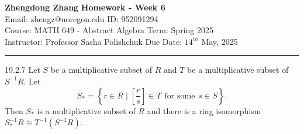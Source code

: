 \documentclass[a4paper, 12pt]{article}
\begin{document}
\noindent
\large\textbf{Zhengdong Zhang} \hfill \textbf{Homework - Week 6} \\
Email: zhengz@uoregon.edu \hfill ID: 952091294 \\
\normalsize Course: MATH 649 - Abstract Algebra \hfill Term: Spring 2025 \\
Instructor: Professor Sasha Polishchuk \hfill Due Date: $14^{th}$ May, 2025 \\
\noindent\rule{7in}{2.8pt}

\begin{problem}{19.2.7}
Let \(S\) be a multiplicative subset of \(R\) and \(T\) be a multiplicative subset of \(S^{-1}R\). Let 
\[S_*=\left\{ r\in R\mid [\frac{r}{s}]\in T\ \ \text{for some}\ \ s\in S \right\}.\]
Then \(S_*\) is a multiplicative subset of \(R\) and there is a ring isomorphism \(S_*^{-1}R\cong T^{-1}(S^{-1}R)\).
\end{problem}
\end{document}
